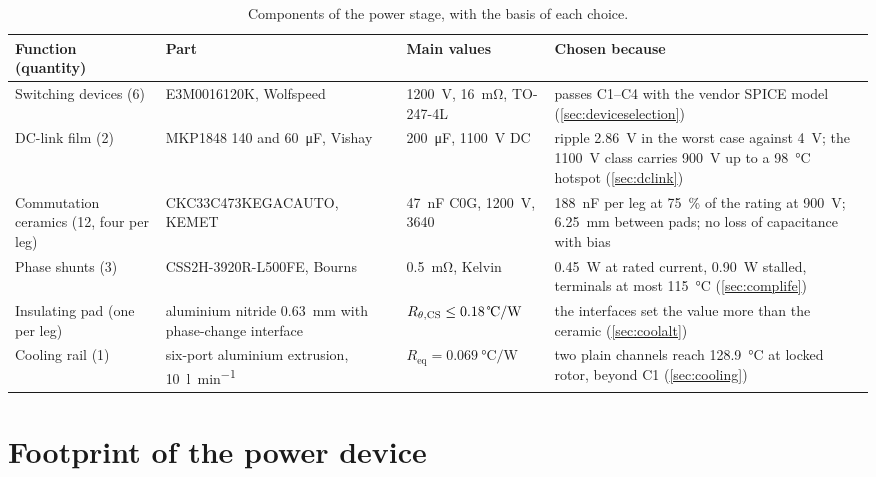 \begin{table}[H]
\centering
\caption{Components of the power stage, with the basis of each choice.}
\label{tab:components}
\label{tab:captdecisions}
\small
\zebra
\begin{tabularx}{\textwidth}{L{0.16\textwidth}L{0.2\textwidth}L{0.15\textwidth}Y}
\toprule
Function (quantity) & Part & Main values & Chosen because \\
\midrule
Switching devices (6) & E3M0016120K, Wolfspeed~\cite{wolfspeed_e3m0016}
  & \SI{1200}{\volt}, \SI{16}{\milli\ohm}, TO-247-4L
  & passes C1--C4 with the vendor SPICE model (\cref{sec:deviceselection}) \\
DC-link film (2) & MKP1848 \SI{140}{} and \SI{60}{\micro\farad}, Vishay~\cite{vishay_mkp1848}
  & \SI{200}{\micro\farad}, \SI{1100}{\volt} DC
  & ripple \SI{2.86}{\volt} in the worst case against \SI{4}{\volt}; the \SI{1100}{\volt} class carries \SI{900}{\volt} up to a \SI{98}{\celsius} hotspot (\cref{sec:dclink}) \\
Commutation ceramics (12, four per leg) & CKC33C473\-KEGACAUTO, KEMET~\cite{kemet_kclink}
  & \SI{47}{\nano\farad} C0G, \SI{1200}{\volt}, 3640
  & \SI{188}{\nano\farad} per leg at \SI{75}{\percent} of the rating at \SI{900}{\volt}; \SI{6.25}{\milli\metre} between pads; no loss of capacitance with bias \\
Phase shunts (3) & CSS2H-3920R-L500FE, Bourns
  & \SI{0.5}{\milli\ohm}, Kelvin
  & \SI{0.45}{\watt} at rated current, \SI{0.90}{\watt} stalled, terminals at most \SI{115}{\celsius} (\cref{sec:complife}) \\
Insulating pad (one per leg) & aluminium nitride \SI{0.63}{\milli\metre} with phase-change interface
  & $\Rthcs \leq \SI{0.18}{\celsius\per\watt}$
  & the interfaces set the value more than the ceramic (\cref{sec:coolalt}) \\
Cooling rail (1) & six-port aluminium extrusion, \SI{10}{\litre\per\minute}
  & $R_\mathrm{eq} = \SI{0.069}{\celsius\per\watt}$
  & two plain channels reach \SI{128.9}{\celsius} at locked rotor, beyond C1 (\cref{sec:cooling}) \\
\bottomrule
\end{tabularx}
\end{table}

\section{Footprint of the power device}

